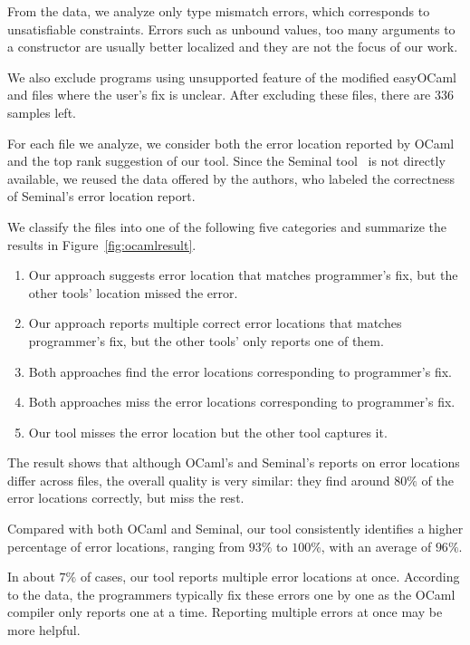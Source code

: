 From the data, we analyze only type mismatch errors, which corresponds
to unsatisfiable constraints. Errors such as unbound values, too many
arguments to a constructor are usually better localized and they are
not the focus of our work. 

We also exclude programs using unsupported feature of the modified
easyOCaml and files where the user's fix is unclear. After excluding
these files, there are 336 samples left.

For each file we analyze, we consider both the error location reported
by OCaml and the top rank suggestion of our tool. Since the Seminal
tool~\cite{lerner:pldi07} is not directly available, we reused the data
offered by the authors, who labeled the correctness of Seminal's error
location report.

We classify the files into one of the following five
categories and summarize the results in Figure~\ref{fig:ocamlresult}.

\begin{enumerate}
\item Our approach suggests error location that matches programmer's
fix, but the other tools' location missed the error.

\item Our approach reports multiple correct error locations that
matches programmer's fix, but the other tools' only reports one of
them.

\item Both approaches find the error locations corresponding to
programmer's fix.

\item Both approaches miss the error locations corresponding to
programmer's fix.

\item Our tool misses the error location but the other tool captures
it.
\end{enumerate}

The result shows that although OCaml's and Seminal's reports on error
locations differ across files, the overall quality is very similar:
they find around $80\%$ of the error locations correctly, but miss the
rest. 

Compared with both OCaml and Seminal, our tool consistently identifies
a higher percentage of error locations,
ranging from $93\%$ to $100\%$, with an average of $96\%$.

In about $7\%$ of
cases, our tool reports multiple error locations at once.
According to the data, the programmers typically fix these errors one
by one as the OCaml compiler only reports one at a time.
Reporting multiple errors at once may be more helpful.

